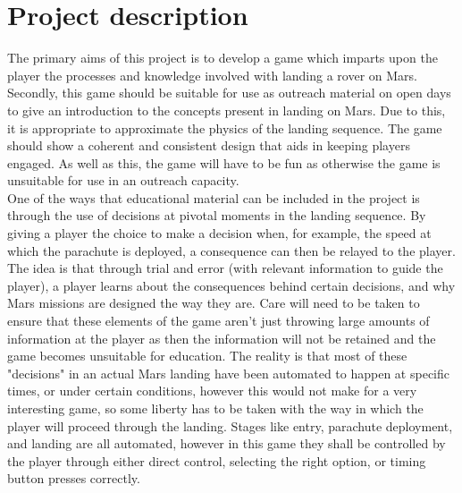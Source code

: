 \documentclass[11pt,fleqn,twoside]{article}
\begin{document}

\mmp



\section{Project description}

The primary aims of this project is to develop a game which imparts upon the player the processes and knowledge involved with landing a rover on Mars. Secondly, this game should be suitable for use as outreach material on open days to give an introduction to the concepts present in landing on Mars. Due to this, it is appropriate to approximate the physics of the landing sequence.   The game should show a coherent and consistent design that aids in keeping players engaged. As well as this, the game will have to be fun as otherwise the game is unsuitable for use in an outreach capacity. \\

One of the ways that educational material can be included in the project is through the use of decisions at pivotal moments in the landing sequence. By giving a player the choice to make a decision when, for example, the speed at which the parachute is deployed, a consequence can then be relayed to the player. The idea is that through trial and error (with relevant information to guide the player), a player learns about the consequences behind certain decisions, and why Mars missions are designed the way they are. Care will need to be taken to ensure that these elements of the game aren't just throwing large amounts of information at the player as then the information will not be retained and the game becomes unsuitable for education. The reality is that most of these "decisions" in an actual Mars landing have been automated to happen at specific times, or under certain conditions, however this would not make for a very interesting game, so some liberty has to be taken with the way in which the player will proceed through the landing. Stages like entry, parachute deployment, and landing are all automated, however in this game they shall be controlled by the player through either direct control, selecting the right option, or timing button presses correctly.\\
\end{document}
